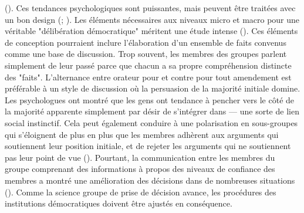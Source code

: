 (\cite{sunstein05:_why_societ_need_dissen}). Ces tendances
psychologiques sont puissantes, mais peuvent être traitées avec un bon
design (\cite{manin05:_democ_delib}; \cite{fishkin09:_when_peopl_speak}). Les éléments
nécessaires aux niveaux micro et macro pour une véritable
"délibération démocratique" méritent une étude intense 
(\cite{gastil12:_makin_direc_democ_delib_random_assem}). Ces éléments de conception pourraient inclure
l'élaboration d'un ensemble de faits convenus comme une base de
discussion. Trop souvent, les membres des groupes parlent simplement
de leur passé parce que chacun a sa propre compréhension distincte des
"faits". L'alternance entre orateur pour et contre pour tout
amendement est préférable à un style de discussion où la persuasion de
la majorité initiale domine. Les psychologues ont montré que les gens
ont tendance à pencher vers le côté de la majorité apparente
simplement par désir de s'intégrer dans --- une sorte de lien
social instinctif. Cela peut également conduire à une polarisation en
sous-groupes qui s'éloignent de plus en plus que les membres adhèrent
aux arguments qui soutiennent leur position initiale, et de rejeter
les arguments qui ne soutiennent pas leur point de vue 
(\cite{sunstein05:_why_societ_need_dissen}). Pourtant, la communication entre les membres du groupe
comprenant des informations à propos des niveaux de confiance des membres a
montré une amélioration des décisions dans de nombreuses situations
(\cite{koriat12:_when_are_two_heads_better}). Comme la science groupe de prise de décision avance,
les procédures des institutions démocratiques doivent être ajustés en
conséquence.\par
